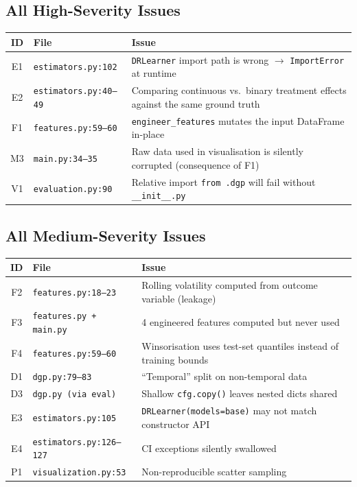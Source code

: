 \documentclass[11pt, letterpaper]{article}
\begin{document}
\subsection{All High-Severity Issues}

\begin{highbox}
\begin{tabularx}{\textwidth}{c l X}
    \toprule
    \textbf{ID} & \textbf{File} & \textbf{Issue} \\
    \midrule
    E1  & \texttt{estimators.py:102}  & \texttt{DRLearner} import path is wrong $\rightarrow$ \texttt{ImportError} at runtime \\
    E2  & \texttt{estimators.py:40--49} & Comparing continuous vs.\ binary treatment effects against the same ground truth \\
    F1  & \texttt{features.py:59--60} & \texttt{engineer\_features} mutates the input DataFrame in-place \\
    M3  & \texttt{main.py:34--35}     & Raw data used in visualisation is silently corrupted (consequence of F1) \\
    V1  & \texttt{evaluation.py:90}   & Relative import \texttt{from .dgp} will fail without \texttt{\_\_init\_\_.py} \\
    \bottomrule
\end{tabularx}
\end{highbox}

\subsection{All Medium-Severity Issues}

\begin{medbox}
\begin{tabularx}{\textwidth}{c l X}
    \toprule
    \textbf{ID} & \textbf{File} & \textbf{Issue} \\
    \midrule
    F2  & \texttt{features.py:18--23} & Rolling volatility computed from outcome variable (leakage) \\
    F3  & \texttt{features.py + main.py} & 4 engineered features computed but never used \\
    F4  & \texttt{features.py:59--60} & Winsorisation uses test-set quantiles instead of training bounds \\
    D1  & \texttt{dgp.py:79--83} & ``Temporal'' split on non-temporal data \\
    D3  & \texttt{dgp.py (via eval)} & Shallow \texttt{cfg.copy()} leaves nested dicts shared \\
    E3  & \texttt{estimators.py:105} & \texttt{DRLearner(models=base)} may not match constructor API \\
    E4  & \texttt{estimators.py:126--127} & CI exceptions silently swallowed \\
    P1  & \texttt{visualization.py:53} & Non-reproducible scatter sampling \\
    \bottomrule
\end{tabularx}
\end{medbox}
\end{document}
